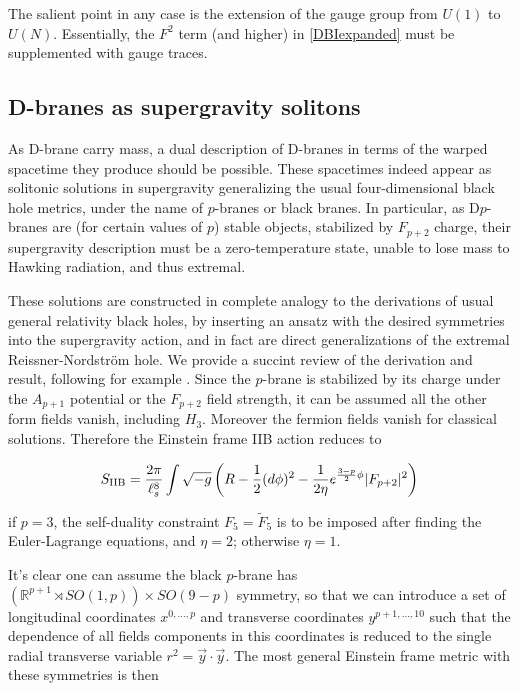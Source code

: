 The salient point in any case is the extension of the gauge group from $U(1)$ to $U(N)$. Essentially, the $F^2$ term (and higher) in \eqref{DBIexpanded} must be supplemented with gauge traces.


\subsection{D-branes as supergravity solitons}

As D-brane carry mass, a dual description of D-branes in terms of the warped spacetime they produce should be possible. These spacetimes indeed appear as solitonic solutions in supergravity generalizing the usual four-dimensional black hole metrics, under the name of $p$-branes or black branes. In particular, as D$p$-branes are (for certain values of $p$) stable objects, stabilized by $F_{p+2}$ charge, their supergravity description must be a zero-temperature state, unable to lose mass to Hawking radiation, and thus extremal.

These solutions are constructed in complete analogy to the derivations of usual general relativity black holes, by inserting an ansatz with the desired symmetries into the supergravity action, and in fact are direct generalizations of the extremal Reissner-Nordstr\"om hole. We provide a succint review of the derivation and result, following for example \cite{MaldacenaDb}. Since the $p$-brane is stabilized by its charge under the $A_{p+1}$ potential or the $F_{p+2}$ field strength, it can be assumed all the other form fields vanish, including $H_3$. Moreover the fermion fields vanish for classical solutions. Therefore the Einstein frame IIB action reduces to

\begin{equation}
	S_\text{IIB} = \frac{2\pi}{\ell_s^8} \int \sqrt{-g} \left( R - \frac{1}{2}(d\phi)^2 - \frac{1}{2\eta} e^{\frac{3-p}{2} \phi} |F_{p+2}|^2 \right)
	\label{simplifaction}
\end{equation}

if $p=3$, the self-duality constraint $F_5 = \tilde F_5$ is to be imposed after finding the Euler-Lagrange equations, and $\eta = 2$; otherwise $\eta = 1$.

It's clear one can assume the black $p$-brane has $\left( \mathbb{R}^{p+1} \rtimes SO(1,p) \right)\times SO(9-p)$ symmetry, so that we can introduce a set of longitudinal coordinates $x^{0,\ldots,p}$ and transverse coordinates $y^{p+1,\ldots,10}$ such that the dependence of all fields components in this coordinates is reduced to the single radial transverse variable $r^2 = \vec y \cdot \vec y$. The most general Einstein frame metric with these symmetries is then

